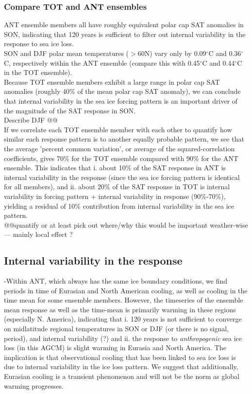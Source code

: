 \documentclass[twocol]{ametsoc}
\begin{document}
\subsubsection{Compare TOT and ANT ensembles}
ANT ensemble members all have roughly equivalent polar cap SAT anomalies in SON, indicating that 120 years is sufficient to filter out internal variability in the response to sea ice loss. \\
SON and DJF polar mean temperatures ($>$60N) vary only by 0.09$^\circ$C and 0.36$^\circ$C, respectively within the ANT ensemble (compare this with 0.45$^\circ$C and 0.44$^\circ$C in the TOT ensemble).  \\
Because TOT ensemble members exhibit a large range in polar cap SAT anomalies (roughly 40\% of the mean polar cap SAT anomaly), we can conclude that internal variability in the sea ice forcing pattern is an important driver of the magnitude of the SAT response in SON. \\
Describe DJF @@ \\
If we correlate each TOT ensemble member with each other to quantify how similar each response pattern is to another equally probable pattern, we see that the average 'percent common variation', or average of the squared-correlation coefficients, gives 70\% for the TOT ensemble compared with 90\% for the ANT ensemble. This indicates that i. about 10\% of the SAT response in ANT is internal variability in the response (since the sea ice forcing pattern is identical for all members), and ii. about 20\% of the SAT response in TOT is internal variability in forcing pattern + internal variability in response (90\%-70\%), yielding a residual of 10\% contribution from internal variability in the sea ice pattern. \\
@@quantify or at least pick out where/why this would be important weather-wise --- mainly local effect ?
 

\subsection{Internal variability in the response}

-Within ANT, which always has the same ice boundary conditions, we find periods in time of Eurasian and North American cooling, as well as cooling in the time mean for some ensemble members. However, the timeseries of the ensemble mean response as well as the time-mean is primarily warming in these regions (especially N. America), indicating that i. 120 years is not sufficient to converge on midlatitude regional temperatures in SON or DJF (or there is no signal, period), and internal variability (?)   and ii. the response to \textit{anthropogenic} sea ice loss (in this AGCM) is slight warming in Eurasia and North America. The implication is that observational cooling that has been linked to sea ice loss is due to internal variability in the ice loss pattern. We suggest that additionally, Eurasian cooling is a transient phenomenon and will not be the norm as global warming progresses.
\end{document}
